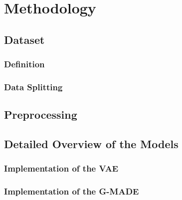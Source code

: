 \cleardoubleoddpage%
\chapter{Methodology}

\section{Dataset}


\subsection{Definition}

\subsection{Data Splitting}

\section{Preprocessing}

\section{Detailed Overview of the Models}

\subsection{Implementation of the VAE}

\subsection{Implementation of the G-MADE}

